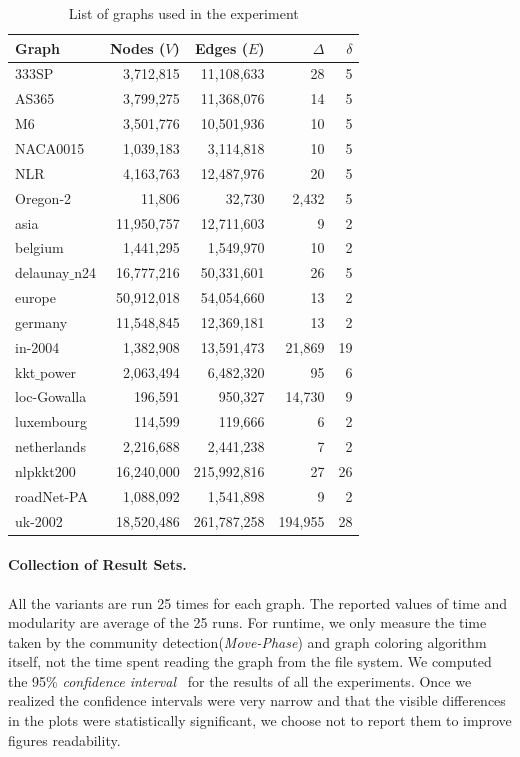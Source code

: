 \documentclass[default,iicol]{sn-jnl}%
\theoremstyle{thmstyleone}%
\theoremstyle{thmstyletwo}%
\theoremstyle{thmstylethree}%
\begin{document}
\begin{table}[htb]
\caption{List of graphs used in the experiment}
\label{tab:Graphlist}
\centering
\begin{tabular}[c]{| l | r | r | r | r |}
\hline
Graph & Nodes ($V$) & Edges ($E$) & $\Delta$ & $\delta$ \\ \hline
333SP  &  3,712,815  &  11,108,633  &  28  &  5  \\ \hline
AS365  &  3,799,275  &  11,368,076  &  14  &  5  \\ \hline
M6  &  3,501,776  &  10,501,936  &  10  &  5  \\ \hline
NACA0015  &  1,039,183  &  3,114,818  &  10  &  5  \\ \hline
NLR  &  4,163,763  &  12,487,976  &  20  &  5  \\ \hline
Oregon-2  &  11,806  &  32,730  &  2,432  &  5  \\ \hline
asia  &  11,950,757  &  12,711,603  &  9  &  2  \\ \hline
belgium  &  1,441,295  &  1,549,970  &  10  &  2  \\ \hline
delaunay$\_$n24  &  16,777,216  &  50,331,601  &  26  &  5  \\ \hline
europe  &  50,912,018  &  54,054,660  &  13  &  2  \\ \hline
germany  &  11,548,845  &  12,369,181  &  13  &  2  \\ \hline
in-2004  &  1,382,908  &  13,591,473  &  21,869  &  19  \\ \hline
kkt$\_$power  &  2,063,494  &  6,482,320  &  95  &  6  \\ \hline
loc-Gowalla  &  196,591  & 950,327 & 14,730 & 9  \\ \hline
luxembourg  &  114,599  &  119,666  &  6  &  2  \\ \hline
netherlands  &  2,216,688  &  2,441,238  &  7  &  2  \\ \hline
nlpkkt200  &  16,240,000  &  215,992,816  &  27  &  26  \\ \hline
roadNet-PA  &  1,088,092  &  1,541,898  &  9  &  2  \\ \hline
uk-2002  &  18,520,486  &  261,787,258  &  194,955  &  28  \\ \hline
\end{tabular}
\end{table}


\paragraph{Collection of Result Sets.}
All the variants are run 25 times for each graph. The reported values
of time and modularity are average of the 25 runs. For
runtime, we only measure the time taken by the community detection(\textit{Move-Phase}) and graph coloring 
algorithm itself, not the time spent reading the graph from the
file system. We computed the 95\% \textit{confidence interval}~\cite{efron1986bootstrap} for the results of all the
experiments. Once we realized  the confidence intervals were very narrow and that the visible differences in the plots were statistically 
significant, we choose not to report them to improve figures readability.
\end{document}
